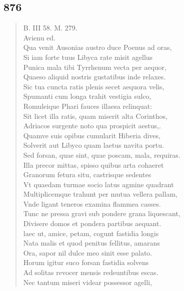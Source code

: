 \documentclass[11pt, a4paper]{report}
\begin{document}
            \subsection*{876}
      \begin{verse}
      B. III 58. M. 279. \\ Avienu ed. \\ Qua venit Ausonias austro duce Poenus ad oras, \\ Si iam forte tuus Libyca rate misit agellus \\ Punica mala tibi Tyrrhenum vecta per aequor, \\ Quaeso aliquid nostris gustatibus inde relaxes. \\ Sic tua cuncta ratis plenis secet aequora velis, \\ Spumanti cum longa trahit vestigia sulco, \\ Romuleique Phari fauces illaesa relinquat: \\ Sit licet illa ratis, quam miserit alta Corinthos, \\ Adriacos surgente noto qua prospicit aestus,. \\ Quamve suis opibus cumularit Hiberia dives, \\ Solverit aut Libyco quam laetus navita portu. \\ Sed forsan, quae sint, quae poscam, mala, requiras. \\ Illa precor mittas, spisso quibus arta cohaeret \\ Granorum fetura situ, castrisque sedentes \\ Vt quaedam turmae socio latus agmine quadrant \\ Multiplicemque trahunt per mutua vellera pallam, \\ Vnde ligant teneros examina flammea casses. \\ Tunc ne pressa gravi sub pondere grana liquescant, \\ Divisere domos et pondera partibus aequant. \\ laec ut, amice, petam, cogunt fastidia longis \\ Nata malis et quod penitus fellitus, amarans \\ Ora, sapor nil dulce meo sinit esse palato. \\ Horum igitur suco forsan fastidia solvens \\ Ad solitas revocer mensis redeuntibus escas. \\ Nec tantum miseri videar possessor agelli, \\ 

\end{verse}
\end{document}

